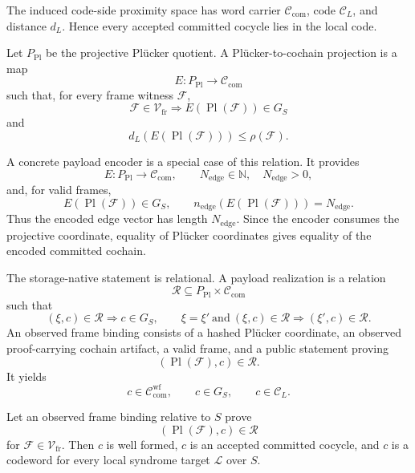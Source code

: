 The induced code-side proximity space has word carrier
\(\mathcal C_{\mathrm{com}}\), code \(\mathcal C_L\), and distance \(d_L\).
Hence every accepted committed cocycle lies in the local code.

\begin{definition}\label{def:plucker-cochain-projection}
Let \(P_{\mathrm{Pl}}\) be the projective Pl\"ucker quotient. A
Pl\"ucker-to-cochain projection is a map
\[
  E:P_{\mathrm{Pl}}\longrightarrow \mathcal C_{\mathrm{com}}
\]
such that, for every frame witness \(\mathcal F\),
\[
  \mathcal F\in\mathcal V_{\mathrm{fr}}
  \Longrightarrow
  E(\operatorname{Pl}(\mathcal F))\in G_S
\]
and
\[
  d_L(E(\operatorname{Pl}(\mathcal F)))\le \rho(\mathcal F).
\]
\end{definition}

A concrete payload encoder is a special case of this relation. It provides
\[
  E:P_{\mathrm{Pl}}\to \mathcal C_{\mathrm{com}},
  \qquad N_{\mathrm{edge}}\in\mathbb N,\quad N_{\mathrm{edge}}>0,
\]
and, for valid frames,
\[
  E(\operatorname{Pl}(\mathcal F))\in G_S,
  \qquad
  n_{\mathrm{edge}}(E(\operatorname{Pl}(\mathcal F)))=N_{\mathrm{edge}}.
\]
Thus the encoded edge vector has length \(N_{\mathrm{edge}}\). Since the
encoder consumes the projective coordinate, equality of Pl\"ucker coordinates
gives equality of the encoded committed cochain.

The storage-native statement is relational. A payload realization is a relation
\[
  \mathcal R\subseteq P_{\mathrm{Pl}}\times \mathcal C_{\mathrm{com}}
\]
such that
\[
  (\xi,c)\in\mathcal R
  \Longrightarrow c\in G_S,
  \qquad
  \xi=\xi'\ \text{and}\ (\xi,c)\in\mathcal R
  \Longrightarrow
  (\xi',c)\in\mathcal R.
\]
An observed frame binding consists of a hashed Pl\"ucker coordinate, an observed
proof-carrying cochain artifact, a valid frame, and a public statement proving
\[
  (\operatorname{Pl}(\mathcal F),c)\in\mathcal R.
\]
It yields
\[
  c\in\mathcal C_{\mathrm{com}}^{\mathrm{wf}},\qquad
  c\in G_S,\qquad
  c\in\mathcal C_L.
\]

\begin{proposition}
\label{prop:observed-binding-codeword}
Let an observed frame binding relative to \(S\) prove
\[
  (\operatorname{Pl}(\mathcal F),c)\in\mathcal R
\]
for \(\mathcal F\in\mathcal V_{\mathrm{fr}}\).
Then \(c\) is well formed, \(c\) is an accepted committed cocycle, and \(c\) is a
codeword for every local syndrome target \(\mathcal L\) over \(S\).
\end{proposition}

